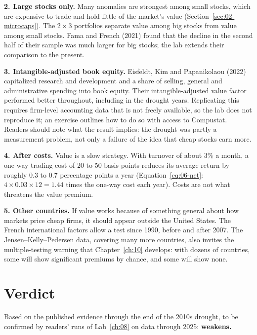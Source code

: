\textbf{2. Large stocks only.} Many anomalies are strongest among small stocks, which are expensive to trade and hold little of the market's value (Section~\ref{sec:02-microcaps}). The $2 \times 3$ portfolios separate value among big stocks from value among small stocks. Fama and French (2021) found that the decline in the second half of their sample was much larger for big stocks; the lab extends their comparison to the present.

\textbf{3. Intangible-adjusted book equity.} Eisfeldt, Kim and Papanikolaou (2022) capitalized research and development and a share of selling, general and administrative spending into book equity. Their intangible-adjusted value factor performed better throughout, including in the drought years. Replicating this requires firm-level accounting data that is not freely available, so the lab does not reproduce it; an exercise outlines how to do so with access to Compustat. Readers should note what the result implies: the drought was partly a measurement problem, not only a failure of the idea that cheap stocks earn more.

\textbf{4. After costs.} Value is a slow strategy. With turnover of about 3\% a month, a one-way trading cost of 20 to 50 basis points reduces its average return by roughly 0.3 to 0.7 percentage points a year (Equation~\eqref{eq:06-net}: $4 \times 0.03 \times 12 = 1.44$ times the one-way cost each year). Costs are not what threatens the value premium.

\textbf{5. Other countries.} If value works because of something general about how markets price cheap firms, it should appear outside the United States. The French international factors allow a test since 1990, before and after 2007. The Jensen--Kelly--Pedersen data, covering many more countries, also invites the multiple-testing warning that Chapter~\ref{ch:10} develops: with dozens of countries, some will show significant premiums by chance, and some will show none.

\section{Verdict}
\label{sec:08-verdict}

Based on the published evidence through the end of the 2010s drought, to be confirmed by readers' runs of Lab~\ref{ch:08} on data through 2025: \textbf{weakens.}


